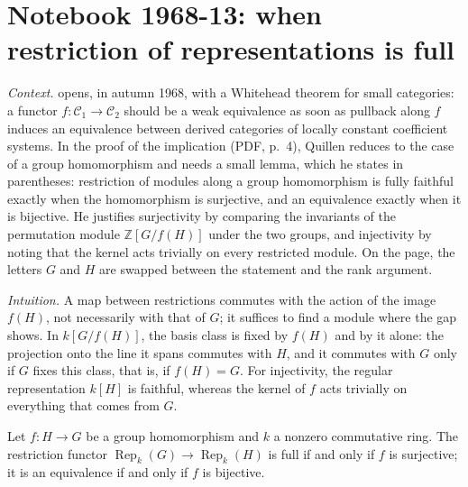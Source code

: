 \section[Notebook 1968-13: when restriction of representations is full]{Notebook 1968-13: when restriction of representations is full\protect{}}\label{sec:quillen-1968-13-rep}

\emph{Context.}  opens, in autumn 1968, with a Whitehead theorem for small categories: a functor $f : \mathcal{C}_1 \to \mathcal{C}_2$ should be a weak equivalence as soon as pullback along $f$ induces an equivalence between derived categories of locally constant coefficient systems. In the proof of the implication  (PDF, p.~4), Quillen reduces to the case of a group homomorphism and needs a small lemma, which he states in parentheses: restriction of modules along a group homomorphism is fully faithful exactly when the homomorphism is surjective, and an equivalence exactly when it is bijective. He justifies surjectivity by comparing the invariants of the permutation module $\mathbb{Z}[G/f(H)]$ under the two groups, and injectivity by noting that the kernel acts trivially on every restricted module. On the page, the letters $G$ and $H$ are swapped between the statement and the rank argument.

\emph{Intuition.} A map between restrictions commutes with the action of the image $f(H)$, not necessarily with that of $G$; it suffices to find a module where the gap shows. In $k[G/f(H)]$, the basis class is fixed by $f(H)$ and by it alone: the projection onto the line it spans commutes with $H$, and it commutes with $G$ only if $G$ fixes this class, that is, if $f(H) = G$. For injectivity, the regular representation $k[H]$ is faithful, whereas the kernel of $f$ acts trivially on everything that comes from $G$.

\begin{encadre}
\begin{theoreme}\label{thm:quillen-1968-13-rep}
Let $f : H \to G$ be a group homomorphism and $k$ a nonzero commutative ring. The restriction functor $\operatorname{Rep}_k(G) \to \operatorname{Rep}_k(H)$ is full if and only if $f$ is surjective; it is an equivalence if and only if $f$ is bijective.
\end{theoreme}
\end{encadre}

